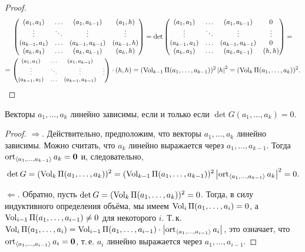 \begin{proof}
\begin{multline*}
\begin{pmatrix}
            (a_1, a_1) & \ldots & (a_1, a_{k - 1}) & (a_1, h)\\
            \vdots & \ddots & \vdots & \vdots\\
            (a_{k - 1}, a_1) & \ldots & (a_{k - 1}, a_{k - 1}) & (a_{k - 1}, h)\\
            (a_k, a_1) & \ldots & (a_k, a_{k - 1}) & (a_k, h)
        \end{pmatrix} = \det
        \begin{pmatrix}
            (a_1, a_1) & \ldots & (a_1, a_{k - 1}) & 0\\
            \vdots & \ddots & \vdots & \vdots\\
            (a_{k - 1}, a_1) & \ldots & (a_{k - 1}, a_{k - 1}) & 0\\
            (a_k, a_1) & \ldots & (a_k, a_{k - 1}) & (h, h)
        \end{pmatrix} =\\\footnotesize =
        \begin{pmatrix}
            (a_1, a_1) & \ldots & (a_1, a_{k - 1})\\
            \vdots & \ddots & \vdots & \vdots\\
            (a_{k - 1}, a_1) & \ldots & (a_{k - 1}, a_{k - 1})\\
        \end{pmatrix} \cdot (h, h) = (\operatorname{Vol}_{k - 1}\Pi(a_1, \ldots, a_{k - 1}))^2\left\lvert h\right\rvert^2 = (\operatorname{Vol}_k\Pi(a_1, \ldots, a_k))^2.
    \end{multline*}
\end{proof}

\begin{corollary}
    Векторы $a_1, \ldots, a_k$ линейно зависимы, если и только если $\det G(a_1, \ldots, a_k) = 0$.
\end{corollary}

\begin{proof}
    $\Rightarrow$. Действительно, предположим, что векторы $a_1, \ldots, a_k$ линейно зависимы. Можно считать, что $a_k$ линейно выражается через $a_1, \ldots, a_{k - 1}$. Тогда $\operatorname{ort}_{\langle a_1, \ldots, a_{k - 1}\rangle}a_k = \boldsymbol{0}$ и, следовательно,
    \[
    \det G = (\operatorname{Vol}_k\Pi(a_1, \ldots, a_k))^2 = (\operatorname{Vol}_{k - 1}\Pi(a_1, \ldots, a_{k - 1}))^2\left\lvert\operatorname{ort}_{\langle a_1, \ldots, a_{k - 1}\rangle}a_k\right\rvert^2 = 0.
    \]
    
    $\Leftarrow$. Обратно, пусть $\det G = (\operatorname{Vol}_k\Pi(a_1, \ldots, a_k))^2 = 0$. Тогда, в силу индуктивного определения объёма, мы имеем $\operatorname{Vol}_i\Pi(a_1, \ldots, a_i) = 0$, а $\operatorname{Vol}_{i - 1}\Pi(a_1, \ldots, a_{i - 1}) \ne 0$ для некоторого $i$. Т.\,к. $\operatorname{Vol}_i\Pi(a_1, \ldots, a_i) = \operatorname{Vol}_{i - 1}\Pi(a_1, \ldots, a_{i - 1}) \cdot \left\lvert\operatorname{ort}_{\langle a_1, \ldots, a_{i - 1}\rangle}a_i\right\rvert$, это означает, что $\operatorname{ort}_{\langle a_1, \ldots, a_{i - 1}\rangle}a_i = \boldsymbol{0}$, т.\,е. $a_i$ линейно выражается через $a_1, \ldots, a_{i - 1}$.
\end{proof}

